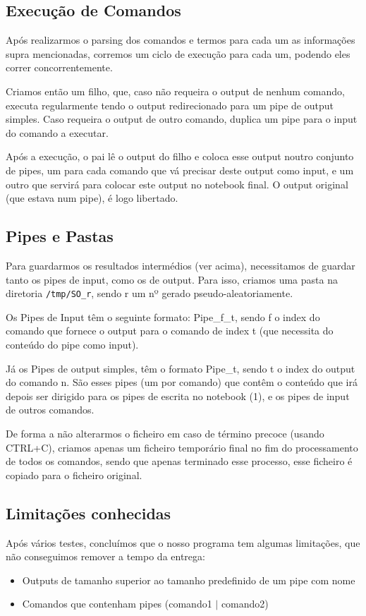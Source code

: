 \documentclass[a4paper]{article}
\begin{document}
	\subsection{Execução de Comandos}
		\tab Após realizarmos o parsing dos comandos e termos para cada um as informações
		supra mencionadas, corremos um ciclo de execução para cada um, podendo eles
		correr concorrentemente.
		\par Criamos então um filho, que, caso não requeira o output de nenhum comando,
		executa regularmente tendo o output redirecionado para um pipe de output simples. Caso
		requeira o output de outro comando, duplica um pipe para o input do comando a executar.
		\par Após a execução, o pai lê o output do filho e coloca esse output noutro conjunto
		de pipes, um para cada comando que vá precisar deste output como input, e um outro
		que servirá para colocar este output no notebook final. O output original (que estava num pipe),
		é logo libertado.

	\subsection{Pipes e Pastas}
		\tab Para guardarmos os resultados intermédios (ver acima), necessitamos de guardar
		tanto os pipes de input, como os de output. Para isso, criamos uma pasta na diretoria
		\texttt{/tmp/SO\_r}, sendo r um nº gerado pseudo-aleatoriamente.
		\par Os Pipes de Input têm o seguinte formato: Pipe\_f\_t, sendo
		f o index do comando que fornece o output para o comando de index t (que necessita do conteúdo do pipe como input).
		\par Já os Pipes de output simples, têm o formato Pipe\_t, sendo t o index do output
		do comando n. São esses pipes (um por comando) que contêm o conteúdo que irá depois ser dirigido para os pipes
		de escrita no notebook (1), e os pipes de input de outros comandos.
		\par De forma a não alterarmos o ficheiro em caso de término precoce (usando CTRL+C),
		criamos apenas um ficheiro temporário final no fim do processamento de todos os comandos,
		sendo que apenas terminado esse processo, esse ficheiro é copiado para o ficheiro
		original.

	\subsection{Limitações conhecidas}
		\tab Após vários testes, concluímos que o nosso programa tem algumas limitações,
		que não conseguimos remover a tempo da entrega:
			\begin{itemize}
				\item Outputs de tamanho superior ao tamanho predefinido de um pipe com nome
				\item Comandos que contenham pipes (comando1 $|$ comando2)
			\end{itemize}
\end{document}
